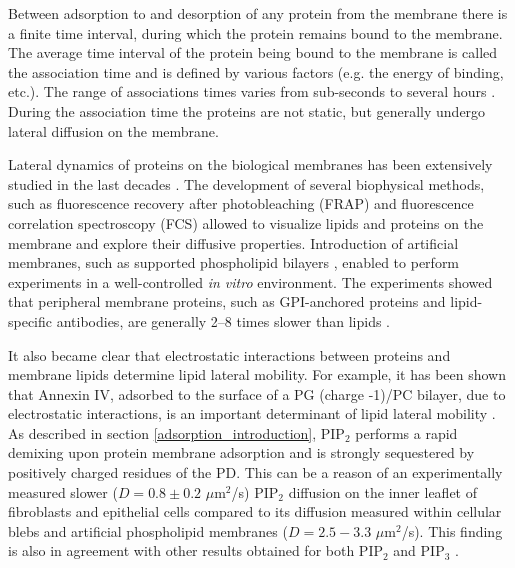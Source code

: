 \label{protein_lipid_dynamics_intoduction}

Between adsorption to and desorption of any protein from the membrane there is a finite time interval, during which the protein remains bound to the membrane. The average time interval of the protein being bound to the membrane is called the association time and is defined by various factors (e.g. the energy of binding, etc.). The range of associations times varies from sub-seconds to several hours \cite{Fivaz2003}. During the association time the proteins are not static, but generally undergo lateral diffusion on the membrane.

Lateral dynamics of proteins on the biological membranes has been extensively studied in the last decades \cite{Singer1972,Saffman1975,Axelrod1983}. The development of several biophysical methods, such as fluorescence recovery after photobleaching (FRAP) and fluorescence correlation spectroscopy (FCS) \cite{Chen2006} allowed to visualize lipids and proteins on the membrane and explore their diffusive properties. Introduction of artificial membranes, such as supported phospholipid bilayers \cite{Tamm1985}, enabled to perform experiments in a well-controlled \emph{in vitro} environment. The experiments showed that peripheral membrane proteins, such as GPI-anchored proteins and lipid-specific antibodies, are generally 2--8 times slower than lipids \cite{Zhang1991, Tamm1988, Stefl2009}.

It also became clear that electrostatic interactions between proteins and membrane lipids determine lipid lateral mobility. For example, it has been shown that Annexin IV, adsorbed to the surface of a PG (charge -1)/PC bilayer, due to electrostatic interactions, is an important determinant of lipid lateral mobility \cite{Gilmanshin1994}. As described in section \ref{adsorption_introduction}, PIP$_2$ performs a rapid demixing upon protein membrane adsorption and is strongly sequestered by positively charged residues of the PD. This can be a reason of an experimentally measured slower ($D=0.8\pm0.2$ $\mu$m$^{2}$/s) PIP$_2$ diffusion on the inner leaflet of fibroblasts and epithelial cells compared to its diffusion measured within cellular blebs and artificial phospholipid membranes ($D=2.5-3.3$ $\mu$m$^{2}$/s). This finding is also in agreement with other results obtained for both PIP$_2$ and PIP$_3$ \cite{Haugh2000, Yaradanakul2007}.

